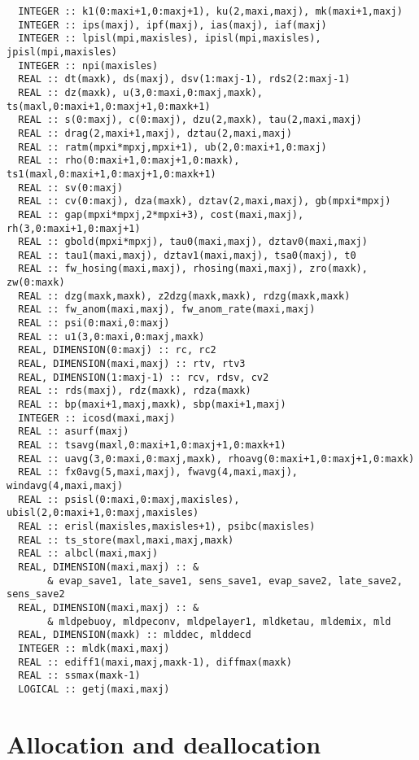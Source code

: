 \documentclass[a4paper,10pt,article]{memoir}
\begin{document}
\begin{verbatim}
  INTEGER :: k1(0:maxi+1,0:maxj+1), ku(2,maxi,maxj), mk(maxi+1,maxj)
  INTEGER :: ips(maxj), ipf(maxj), ias(maxj), iaf(maxj)
  INTEGER :: lpisl(mpi,maxisles), ipisl(mpi,maxisles), jpisl(mpi,maxisles)
  INTEGER :: npi(maxisles)
  REAL :: dt(maxk), ds(maxj), dsv(1:maxj-1), rds2(2:maxj-1)
  REAL :: dz(maxk), u(3,0:maxi,0:maxj,maxk), ts(maxl,0:maxi+1,0:maxj+1,0:maxk+1)
  REAL :: s(0:maxj), c(0:maxj), dzu(2,maxk), tau(2,maxi,maxj)
  REAL :: drag(2,maxi+1,maxj), dztau(2,maxi,maxj)
  REAL :: ratm(mpxi*mpxj,mpxi+1), ub(2,0:maxi+1,0:maxj)
  REAL :: rho(0:maxi+1,0:maxj+1,0:maxk), ts1(maxl,0:maxi+1,0:maxj+1,0:maxk+1)
  REAL :: sv(0:maxj)
  REAL :: cv(0:maxj), dza(maxk), dztav(2,maxi,maxj), gb(mpxi*mpxj)
  REAL :: gap(mpxi*mpxj,2*mpxi+3), cost(maxi,maxj), rh(3,0:maxi+1,0:maxj+1)
  REAL :: gbold(mpxi*mpxj), tau0(maxi,maxj), dztav0(maxi,maxj)
  REAL :: tau1(maxi,maxj), dztav1(maxi,maxj), tsa0(maxj), t0
  REAL :: fw_hosing(maxi,maxj), rhosing(maxi,maxj), zro(maxk), zw(0:maxk)
  REAL :: dzg(maxk,maxk), z2dzg(maxk,maxk), rdzg(maxk,maxk)
  REAL :: fw_anom(maxi,maxj), fw_anom_rate(maxi,maxj)
  REAL :: psi(0:maxi,0:maxj)
  REAL :: u1(3,0:maxi,0:maxj,maxk)
  REAL, DIMENSION(0:maxj) :: rc, rc2
  REAL, DIMENSION(maxi,maxj) :: rtv, rtv3
  REAL, DIMENSION(1:maxj-1) :: rcv, rdsv, cv2
  REAL :: rds(maxj), rdz(maxk), rdza(maxk)
  REAL :: bp(maxi+1,maxj,maxk), sbp(maxi+1,maxj)
  INTEGER :: icosd(maxi,maxj)
  REAL :: asurf(maxj)
  REAL :: tsavg(maxl,0:maxi+1,0:maxj+1,0:maxk+1)
  REAL :: uavg(3,0:maxi,0:maxj,maxk), rhoavg(0:maxi+1,0:maxj+1,0:maxk)
  REAL :: fx0avg(5,maxi,maxj), fwavg(4,maxi,maxj), windavg(4,maxi,maxj)
  REAL :: psisl(0:maxi,0:maxj,maxisles), ubisl(2,0:maxi+1,0:maxj,maxisles)
  REAL :: erisl(maxisles,maxisles+1), psibc(maxisles)
  REAL :: ts_store(maxl,maxi,maxj,maxk)
  REAL :: albcl(maxi,maxj)
  REAL, DIMENSION(maxi,maxj) :: &
       & evap_save1, late_save1, sens_save1, evap_save2, late_save2, sens_save2
  REAL, DIMENSION(maxi,maxj) :: &
       & mldpebuoy, mldpeconv, mldpelayer1, mldketau, mldemix, mld
  REAL, DIMENSION(maxk) :: mlddec, mlddecd
  INTEGER :: mldk(maxi,maxj)
  REAL :: ediff1(maxi,maxj,maxk-1), diffmax(maxk)
  REAL :: ssmax(maxk-1)
  LOGICAL :: getj(maxi,maxj)
\end{verbatim}

\section{Allocation and deallocation}


\end{document}
